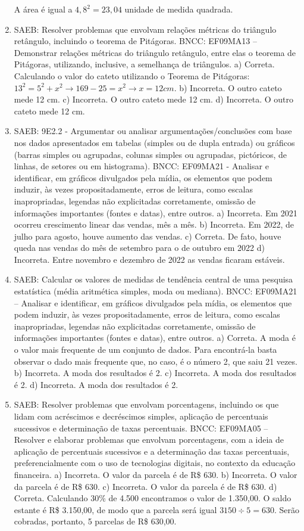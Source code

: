 \begin{enumerate}
A área é igual a $4,8^2 = 23,04$ unidade de medida quadrada.

\item
SAEB: Resolver problemas que envolvam relações métricas do
triângulo retângulo, incluindo o teorema de Pitágoras.
BNCC: EF09MA13 -- Demonstrar relações métricas do triângulo retângulo,
entre elas o teorema de Pitágoras, utilizando, inclusive, a semelhança
de triângulos.
a) Correta. Calculando o valor do cateto utilizando o Teorema de 
Pitágoras: $13^2 = 5^2 + x^2 \rightarrow 169 - 25 = x^2 \rightarrow x = 12 cm$.
b) Incorreta. O outro cateto mede 12 cm.
c) Incorreta. O outro cateto mede 12 cm.
d) Incorreta. O outro cateto mede 12 cm.

\item
SAEB: 9E2.2 - Argumentar ou analisar argumentações/conclusões com base
nos dados apresentados em tabelas (simples ou de dupla entrada) ou
gráficos (barras simples ou agrupadas, colunas simples ou agrupadas,
pictóricos, de linhas, de setores ou em histograma).
BNCC: EF09MA21 - Analisar e identificar, em gráficos divulgados pela
mídia, os elementos que podem induzir, às vezes propositadamente, erros
de leitura, como escalas inapropriadas, legendas não explicitadas
corretamente, omissão de informações importantes (fontes e datas), entre
outros.
a) Incorreta. Em 2021 ocorreu crescimento linear das vendas, mês a mês.
b) Incorreta. Em 2022, de julho para agosto, houve aumento das vendas.
c) Correta. De fato, houve queda nas vendas do mês de setembro para 
o de outubro em 2022 
d) Incorreta. Entre novembro e dezembro de 2022 as vendas ficaram 
estáveis.

\item
SAEB: Calcular os valores de medidas de tendência central de uma
pesquisa estatística (média aritmética simples, moda ou mediana).
BNCC: EF09MA21 -- Analisar e identificar, em gráficos divulgados pela
mídia, os elementos que podem induzir, às vezes propositadamente, erros
de leitura, como escalas inapropriadas, legendas não explicitadas
corretamente, omissão de informações importantes (fontes e datas), entre
outros.
a) Correta. A moda é o valor mais frequente de um conjunto de dados. Para
encontrá-la basta observar o dado mais frequente que, no caso, é o número
2, que saiu 21 vezes.
b) Incorreta. A moda dos resultados é 2.
c) Incorreta. A moda dos resultados é 2.
d) Incorreta. A moda dos resultados é 2.

\item
SAEB: Resolver problemas que envolvam porcentagens, incluindo os
que lidam com acréscimos e decréscimos simples, aplicação de percentuais
sucessivos e determinação de taxas percentuais.
BNCC: EF09MA05 -- Resolver e elaborar problemas que envolvam
porcentagens, com a ideia de aplicação de percentuais sucessivos e a
determinação das taxas percentuais, preferencialmente com o uso de
tecnologias digitais, no contexto da educação financeira.
a) Incorreta. O valor da parcela é de R\$ 630.
b) Incorreta. O valor da parcela é de R\$ 630.
c) Incorreta. O valor da parcela é de R\$ 630.
d) Correta. Calculando 30\% de 4.500 encontramos o valor de 1.350,00. O 
saldo estante é R\$ 3.150,00, de modo que a parcela será igual 
$3150 \div 5 = 630$. Serão cobradas, portanto, 5 parcelas de R\$ 630,00.


\end{enumerate}
